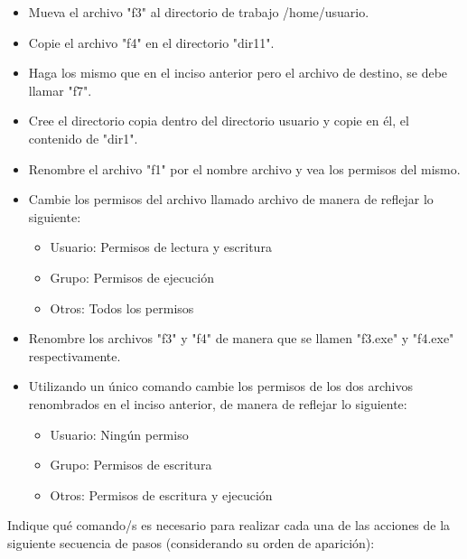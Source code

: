 \begin{questions}
\begin{itemize}
	\item Mueva el archivo "f3" al directorio de trabajo /home/usuario.
	\item Copie el archivo "f4" en el directorio "dir11".
	\item Haga los mismo que en el inciso anterior pero el archivo de destino, se debe llamar "f7".
	\item Cree el directorio copia dentro del directorio usuario y copie en él, el contenido de "dir1".
	\item Renombre el archivo "f1" por el nombre archivo y vea los permisos del mismo.
	\item Cambie los permisos del archivo llamado archivo de manera de reflejar lo siguiente:
	\begin{itemize}
		\item Usuario: Permisos de lectura y escritura
		\item Grupo: Permisos de ejecución
		\item Otros: Todos los permisos
	\end{itemize}
	\item Renombre los archivos "f3" y "f4" de manera que se llamen "f3.exe" y "f4.exe" respectivamente.
	\item	Utilizando un único comando cambie los permisos de los dos archivos renombrados en el inciso anterior, de manera de reflejar lo siguiente:
	\begin{itemize}
		\item Usuario: Ningún permiso
		\item Grupo: Permisos de escritura
		\item Otros: Permisos de escritura y ejecución
	\end{itemize}
\end{itemize}

\question Indique qué comando/s es necesario para realizar cada una de las acciones de la siguiente secuencia de pasos (considerando su orden de aparición):
\end{questions}
